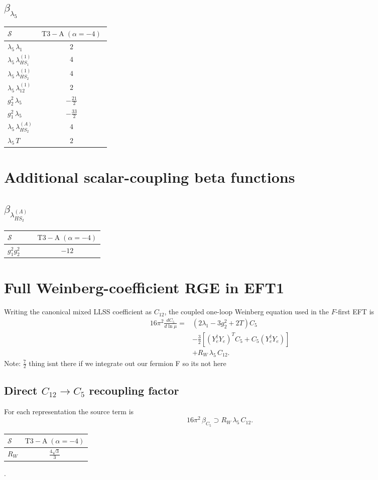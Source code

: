 \documentclass[9pt]{article}
\begin{document}
\subsection*{$ \beta_{\lambda_5} $}
\begin{longtable}{@{}p{0.31\linewidth}c@{}}
\toprule
$\mathcal{S}$ & $ \mathrm{T3-A}\;(\alpha=-4) $ \\
\midrule
$ \lambda_5\,\lambda_1 $ & $ 2 $ \\
$ \lambda_5\,\lambda_{HS_1}^{(1)} $ & $ 4 $ \\
$ \lambda_5\,\lambda_{HS_2}^{(1)} $ & $ 4 $ \\
$ \lambda_5\,\lambda_{12}^{(1)} $ & $ 2 $ \\
$ g_2^2\,\lambda_5 $ & $ - \frac{21}{2} $ \\
$ g_1^2\,\lambda_5 $ & $ - \frac{33}{2} $ \\
$ \lambda_5\,\lambda_{HS_2}^{(A)} $ & $ 4 $ \\
$ \lambda_5\,T $ & $ 2 $ \\
\bottomrule
\end{longtable}
\section*{Additional scalar-coupling beta functions}
\subsection*{$ \beta_{\lambda_{HS_2}^{(A)}} $}
\begin{longtable}{@{}p{0.31\linewidth}c@{}}
\toprule
$\mathcal{S}$ & $ \mathrm{T3-A}\;(\alpha=-4) $ \\
\midrule
$ g_1^2g_2^2 $ & $ -12 $ \\
\bottomrule
\end{longtable}

\section*{Full Weinberg-coefficient RGE in EFT1}
Writing the canonical mixed LLSS coefficient as $C_{12}$, the coupled one-loop Weinberg equation used in the $F$-first EFT is
\begin{align}
16\pi^2\frac{dC_5}{d\ln\mu}={}&(2\lambda_1-3g_2^2+2T)C_5\\
&-\frac32\left[(Y_e^\dagger Y_e)^T C_5+C_5(Y_e^\dagger Y_e)\right]\\
&+R_W\,\lambda_5\,C_{12}.
\end{align}
Note: $\frac{7}{2}$ thing isnt there if we integrate out our fermion F so its not here \subsection*{Direct $C_{12}\to C_5$ recoupling factor}
For each representation the source term is
\[16\pi^2\,\beta_{C_5}\supset R_W\,\lambda_5\,C_{12}.\]
\begin{longtable}{@{}lc@{}}
\toprule
$\mathcal{S}$ & $ \mathrm{T3-A}\;(\alpha=-4) $ \\
\midrule
$R_W$ & $ \frac{4 \sqrt{3}}{3} $ \\
\bottomrule
\end{longtable}
.
\end{document}
